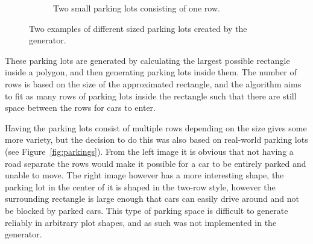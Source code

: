 \begin{figure}[H]
\begin{subfigure}[b]{0.45\textwidth}
     \caption{Two small parking lots consisting of one row.}
   \end{subfigure}
     \caption{Two examples of different sized parking lots created by the generator.}
   \label{fig:results_parking_sizebased}
 \end{figure}

These parking lots are generated by calculating the largest possible rectangle inside a polygon, and then generating parking lots inside them.
The number of rows is based on the size of the approximated rectangle, and the algorithm aims to fit as many rows of parking lots inside the rectangle such that there are still space between the rows for cars to enter.

Having the parking lots consist of multiple rows depending on the size gives some more variety, but the decision to do this was also based on real-world parking lots (see Figure~\ref{fig:parkings}).
From the left image it is obvious that not having a road separate the rows would make it possible for a car to be entirely parked and unable to move.
The right image however has a more interesting shape, the parking lot in the center of it is shaped in the two-row style, however the surrounding rectangle is large enough that cars can easily drive around and not be blocked by parked cars.
This type of parking space is difficult to generate reliably in arbitrary plot shapes, and as such was not implemented in the generator.

